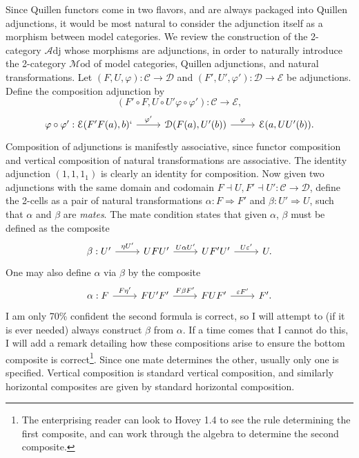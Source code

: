 \begin{construction}\label{3.1.10}
	Since Quillen functors come in two flavors, and are always packaged into Quillen adjunctions, it would be most natural to consider the adjunction itself as a morphism between model categories. We review the construction of the 2-category $\mathcal{A} \mathrm{dj} $ whose morphisms are adjunctions, in order to naturally introduce the 2-category $\mathcal{M} \mathrm{od} $ of model categories, Quillen adjunctions, and natural transformations. Let $(F,U,\varphi): \mathcal{C}  \to \mathcal{D} $ and $(F',U',\varphi'): \mathcal{D}  \to \mathcal{E} $ be adjunctions. Define the composition adjunction by
	\[
		(F'\circ F,U\circ U'\varphi \circ \varphi'): \mathcal{C}  \to \mathcal{E} ,
	\]
	\[\begin{tikzcd}[row sep = 2.5em, column sep = 2.5em]
	\varphi \circ \varphi' : \mathcal{E} (F'F(a),b)\ar[" \varphi' ", r] ` & \mathcal{D} (F(a),U'(b))\ar[" \varphi ", r]  & \mathcal{E} (a,UU'(b)).
	\end{tikzcd}\]
	Composition of adjunctions is manifestly associative, since functor composition and vertical composition of natural transformations are associative. The identity adjunction $(1,1,1_1)$ is clearly an identity for composition. Now given two adjunctions with the same domain and codomain $F\dashv U,F'\dashv U' : \mathcal{C}  \to \mathcal{D} $, define the 2-cells as a pair of natural transformations $\alpha : F \Rightarrow F'$ and $\beta : U' \Rightarrow U$, such that $\alpha$ and $\beta$ are \emph{mates}. The mate condition states that given $\alpha$, $\beta$ must be defined as the composite
	\[\begin{tikzcd}[row sep = 2.5em, column sep = 2.5em]
		\beta : U' \ar[" \eta U' ", r]  & UFU' \ar[" U\alpha U' ", r]  & UF'U' \ar[" U\varepsilon' ", r]  & U.
	\end{tikzcd}\]
	One may also define $\alpha$ via $\beta$ by the composite
	\[\begin{tikzcd}[row sep = 2.5em, column sep = 2.5em]
	\alpha : F \ar[" F\eta' ", r]  & FU'F' \ar[" F\beta F' ", r]  & FUF' \ar[" \varepsilon F'", r]  & F'.
	\end{tikzcd}\]
	I am only 70\% confident the second formula is correct, so I will attempt to (if it is ever needed) always construct $\beta$ from $\alpha$. If a time comes that I cannot do this, I will add a remark detailing how these compositions arise to ensure the bottom composite is correct\footnote{The enterprising reader can look to Hovey 1.4 to see the rule determining the first composite, and can work through the algebra to determine the second composite.}. Since one mate determines the other, usually only one is specified. Vertical composition is standard vertical composition, and similarly horizontal composites are given by standard horizontal composition.


\end{construction}
